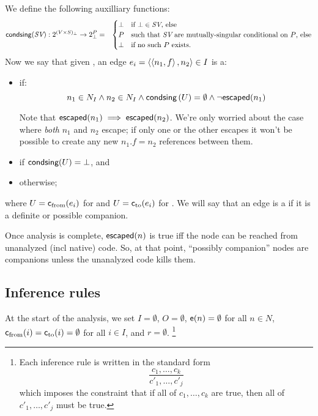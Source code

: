 \documentclass[11pt,notitlepage]{article}
\newcommand{\bigvar}[1]{\ensuremath{\text{\it #1}}}
\newcommand{\func}[1]{\ensuremath{\text{\sffamily #1}}}
\begin{document}

We define the following auxilliary functions:
\begin{eqnarray*}
\func{condsing}(\bigvar{SV}):2^{(V\times S)_\bot}\to 2^P_\bot &=& \begin{cases}
\bot & \text{if }\bot\in\bigvar{SV}\text{, else}\\
P&\text{such that }\bigvar{SV}\text{ are mutually-singular conditional
                                     on }P\text{, else} \\
\bot & \text{if no such }P\text{ exists.}
\end{cases}
\end{eqnarray*}
Now we say that given \ptgraph,
an edge $e_i=\left\langle \left\langle n_1,f \right\rangle,n_2 \right\rangle \in I$ is a:
\begin{itemize}
\item {} if:
\[
 n_1\in N_I \wedge n_2\in N_I \wedge
 \func{condsing}\left(U\right)=\emptyset \wedge
 \neg\func{escaped}(n_1)
\]

Note that $\func{escaped}(n_1)\implies\func{escaped}(n_2)$.  
We're only worried about the case where {\it both} $n_1$ and $n_2$
escape; if only one or the other escapes it won't be possible to
create any new $n_1.f=n_2$ references between them.
\item {} if \(
 \func{condsing}(U) = \bot
\), and
\item {} otherwise;
\end{itemize}
where 
$U=\func{c}_\text{from}(e_i)$ for  and
$U=\func{c}_\text{to}(e_i)$ for .
We will say that an edge is a  if it is a
definite or possible companion.  

Once analysis is complete, $\func{escaped}(n)$ is true iff the node
can be reached from unanalyzed (incl native) code.  So, at that point,
``possibly companion'' nodes are companions unless the unanalyzed code
kills them.

\subsection{Inference rules}
At the start of the analysis, we set $I=\emptyset$, $O=\emptyset$,
$\func{e}(n)=\emptyset$ for all $n\in N$, 
$\func{c}_\text{from}(i)=\func{c}_\text{to}(i)=\emptyset$ for all $i\in I$,
and $r=\emptyset$.%
\footnote{
Each inference rule is written in the standard form
\[\dfrac{c_1,\ldots,c_k}{c'_1,\ldots,c'_j}\]
which imposes the constraint that if all of $c_1,\ldots,c_k$ are true,
then all of $c'_1,\ldots,c'_j$ must be true.
}
\end{document}
